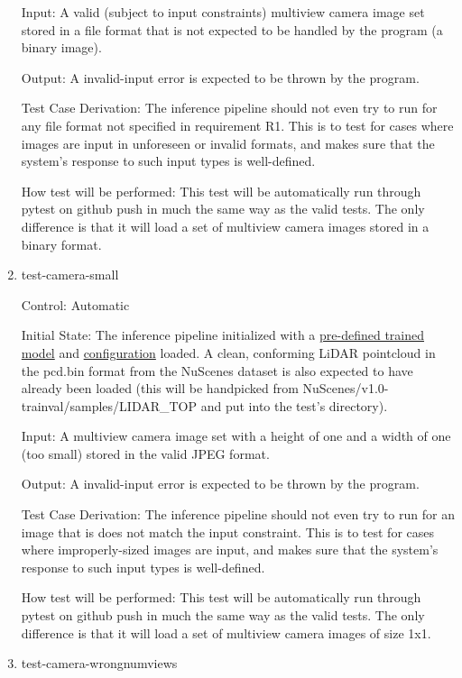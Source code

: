 \documentclass[12pt, titlepage]{article}
\begin{document}
\begin{enumerate}
Input: A valid (subject to input constraints) multiview camera image set stored in a file format that is not expected to be handled by the program (a binary image).
					
Output: A invalid-input error is expected to be thrown by the program.

Test Case Derivation: The inference pipeline should not even try to run for any file format not specified in requirement R1. This is to test for cases
where images are input in unforeseen or invalid formats, and makes sure that the system's response to such input types is well-defined. 

How test will be performed: This test will be automatically run through pytest on github push in much the same way as the valid tests. The only difference is that it will
load a set of multiview camera images stored in a binary format.

\item{test-camera-small\\}

Control: Automatic
					
Initial State: The inference pipeline initialized with a \href{https://drive.google.com/file/d/1X50b-8immqlqD8VPAUkSKI0Ls-4k37g9/view}{pre-defined trained model} and \href{https://github.com/open-mmlab/OpenPCDet/blob/master/tools/cfgs/nuscenes_models/bevfusion.yaml}{configuration} loaded. A clean, conforming LiDAR pointcloud in the pcd.bin format
from the NuScenes dataset is also expected to have already been loaded (this will be handpicked from NuScenes/v1.0-trainval/samples/LIDAR\_TOP and put into the test's directory).
					
Input: A multiview camera image set with a height of one and a width of one (too small) stored in the valid JPEG format.
					
Output: A invalid-input error is expected to be thrown by the program.

Test Case Derivation: The inference pipeline should not even try to run for an image that is does not match the input constraint. This is to test for cases
where improperly-sized images are input, and makes sure that the system's response to such input types is well-defined. 

How test will be performed: This test will be automatically run through pytest on github push in much the same way as the valid tests. The only difference is that it will
load a set of multiview camera images of size 1x1.

\item{test-camera-wrongnumviews\\}


\end{enumerate}
\end{document}
